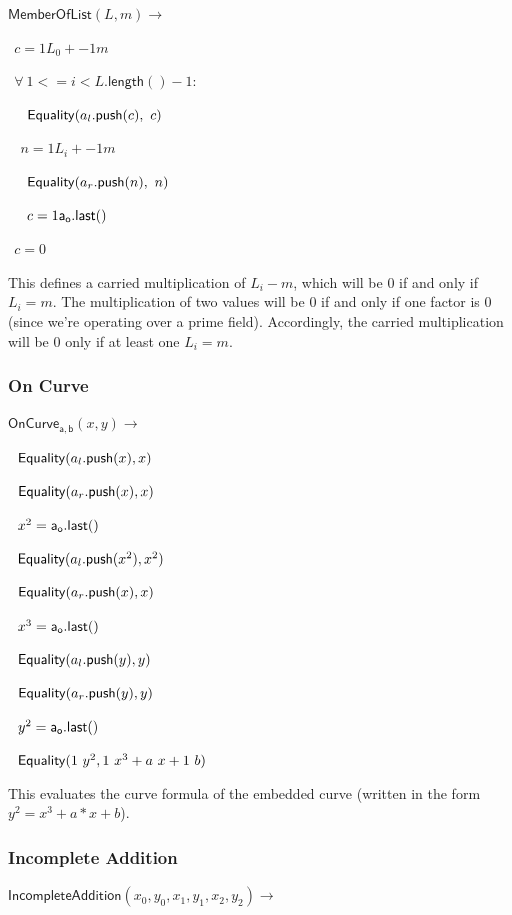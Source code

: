 \documentclass[]{article}
\begin{document}
\newcommand{\memberlist}{\mathsf{MemberOfList}}

$\memberlist(L, m) \rightarrow$

$~~c = 1 L_0 + -1 m$

$~~\forall ~1 <= i < L\mathsf{.length}() - 1:$

$~~~~\mathsf{Equality}(a_l\mathsf{.push}(c), ~c)$

$~~~~n = 1 L_i + -1 m$

$~~~~\mathsf{Equality}(a_r\mathsf{.push}(n), ~n)$

$~~~~c = 1 \mathsf{a_o.last()}$

$~~c = 0$

This defines a carried multiplication of $L_i - m$, which will be $0$ if and only if $L_i = m$. The multiplication of two values will be $0$ if and only if one factor is $0$ (since we're operating over a prime field). Accordingly, the carried multiplication will be $0$ only if at least one $L_i = m$.

\newpage

\subsubsection{On Curve}

\newcommand{\oncurve}{\mathsf{OnCurve_{a,b}}}

$\oncurve(x, y) \rightarrow$

$~~\mathsf{Equality}(a_l\mathsf{.push}(x), x)$

$~~\mathsf{Equality}(a_r\mathsf{.push}(x), x)$

$~~x^2 = \mathsf{a_o.last()}$

$~~\mathsf{Equality}(a_l\mathsf{.push}(x^2), x^2)$

$~~\mathsf{Equality}(a_r\mathsf{.push}(x), x)$

$~~x^3 = \mathsf{a_o.last()}$

$~~\mathsf{Equality}(a_l\mathsf{.push}(y), y)$

$~~\mathsf{Equality}(a_r\mathsf{.push}(y), y)$

$~~y^2 = \mathsf{a_o.last()}$

$~~\mathsf{Equality}(1 ~y^2, 1 ~x^3 + a ~x + 1 ~b)$

This evaluates the curve formula of the embedded curve (written in the form $y^2 = x^3 + a * x + b$).

\subsubsection{Incomplete Addition}

\newcommand{\incompleteadd}{\mathsf{IncompleteAddition}}

$\incompleteadd(x_0, y_0, x_1, y_1, x_2, y_2) \rightarrow$
\end{document}
